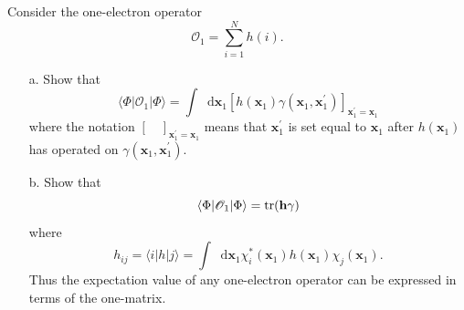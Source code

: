 \documentclass[a4paper]{book}
\newcounter{exercise}[chapter]
\newcommand\tr[1]{\mathrm{tr(#1)}}
\newcommand*{\dif}{\mathop{}\!\mathrm{d}}
\begin{document}
	\begin{exercise}
	Consider the one-electron operator
	\[
		\mathscr{O}_1 = \sum_{i=1}^N h(i).
	\]
	\begin{enumerate}
	
	\item[a.] Show that
	\[
		\langle \Phi | \mathscr{O}_1 | \Phi \rangle = \int \dif \boldsymbol{x}_1 \left[ h( \boldsymbol{x}_1  ) \gamma( \boldsymbol{x}_1 , \boldsymbol{x}^\prime_1 ) \right]_{ \boldsymbol{x}^\prime_1 = \boldsymbol{x}_1}
	\]
	where the notation $[ \quad ]_{ \boldsymbol{x}^\prime_1 = \boldsymbol{x}_1}$ means that $\boldsymbol{x}^\prime_1$ is set equal to $\boldsymbol{x}_1$ after $h(\boldsymbol{x}_1)$ has operated on $\gamma( \boldsymbol{x}_1 , \boldsymbol{x}^\prime_1 )$.
	
	\item[b.] Show that
	\[
		\langle \Phi | \mathscr{O}_1 | \Phi \rangle = \tr{{\bf h}\gamma}
	\]
	where
	\[
		h_{ij} = \langle i | h | j \rangle = \int \dif \boldsymbol{x}_1 \chi^*_i( \boldsymbol{x}_1 ) h( \boldsymbol{x}_1 ) \chi_j( \boldsymbol{x}_1 ).
	\]
	Thus the expectation value of any one-electron operator can be expressed in terms of the one-matrix.
	\end{enumerate}
	
	\end{exercise}
	
\end{document}
